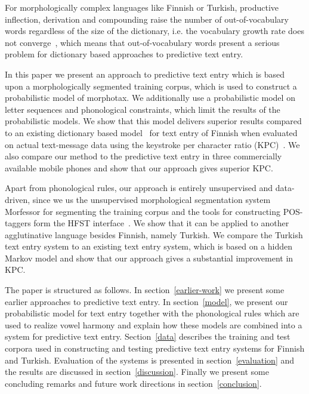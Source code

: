 \documentclass{llncs}
\begin{document}
For morphologically complex languages like Finnish or Turkish,
productive inflection, derivation and compounding raise the number of
out-of-vocabulary words regardless of the size of the dictionary, i.e. the vocabulary growth rate does not converge~\cite{Creutz_morph-basedspeech},
which means that out-of-vocabulary words present a serious problem for
dictionary based approaches to predictive text entry.

In this paper we present an approach to predictive text entry which is
based upon a morphologically segmented training corpus, which is used
to construct a probabilistic model of morphotax. We additionally use a
probabilistic model on letter sequences and phonological constraints,
which limit the results of the probabilistic models. We show that this
model delivers superior results compared to an existing dictionary
based model~\cite{silfverberg/2011/cla} for text entry of Finnish when
evaluated on actual text-message data using the keystroke per
character ratio (KPC)~\cite{MacKenzie02kspc}. We also compare our
method to the predictive text entry in three commercially available
mobile phones and show that our approach gives superior KPC.

Apart from phonological rules, our approach is entirely unsupervised
and data-driven, since we us the unsupervised morphological
segmentation system Morfessor \cite{Creutz07ACMTSLP} for segmenting
the training corpus and the tools for constructing POS-taggers form
the HFST interface~\cite{hfst/2011}. We show that it can be applied to
another agglutinative language besides Finnish, namely Turkish. We
compare the Turkish text entry system to an existing text entry
system, which is based on a hidden Markov model and show that our
approach gives a substantial improvement in KPC.

The paper is structured as follows. In section~\ref{earlier-work} we
present some earlier approaches to predictive text entry. In
section~\ref{model}, we present our probabilistic model for text entry
together with the phonological rules which are used to realize vowel
harmony and explain how these models are combined into a system for
predictive text entry. Section~\ref{data} describes the training and
test corpora used in constructing and testing predictive text entry
systems for Finnish and Turkish. Evaluation of the systems is
presented in section~\ref{evaluation} and the results are discussed in
section~\ref{discussion}. Finally we present some concluding remarks
and future work directions in section~\ref{conclusion}.
\end{document}

